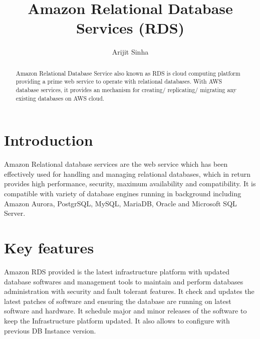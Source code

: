 
\title{Amazon Relational Database Services (RDS)}

\author{Arijit Sinha}

\renewcommand{\shortauthors}{A.Sinha}

\begin{abstract}
Amazon Relational Database Service also known as RDS is cloud 
computing platform providing a prime web service to operate 
with relational databases. With AWS database services, 
it provides an mechanism for creating/ replicating/ migrating 
any existing databases on AWS cloud.

\end{abstract}


\maketitle

\section{Introduction}
Amazon Relational database services are the web service which 
has been effectively used for  handling and managing relational 
databases, which in return provides high performance, security, 
maximum availability and compatibility. 
It is compatible with variety of database engines running in 
background including Amazon Aurora, PostgrSQL, MySQL, MariaDB, 
Oracle and Microsoft SQL Server.

\section{Key features}
Amazon RDS provided is the latest infrastructure platform with 
updated database softwares and management tools to maintain and 
perform databases administration with security and fault tolerant 
features. It check and updates the latest patches of software and 
ensuring the database are running on latest software and hardware. 
It schedule major and minor releases of the software to keep the 
Infrastructure platform updated. It also allows to configure with 
previous DB Instance version.


